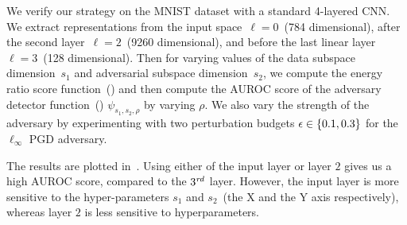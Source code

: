 
We verify our strategy on the MNIST dataset with a standard 4-layered CNN. We
extract representations from the input space~\(\ell=0\)~(784 dimensional), after
the second layer~\(\ell=2\)~(9260 dimensional), and before the last linear
layer~\(\ell=3\)~(128 dimensional). Then for varying values of the data subspace
dimension~\(s_1\) and adversarial subspace dimension~\(s_2\), we compute the energy ratio score function~() and then compute the AUROC score of the adversary detector function~() \(\psi_{s_1, s_2, \rho} \)  by varying \(\rho\). We also vary the strength of the adversary by experimenting with two perturbation budgets \(\epsilon\in\left\{{0.1, 0.3}\right\}\) for the \(\ell_\infty\) PGD adversary.

The results are plotted in~. Using either of the
input layer or layer \(2\) gives us a high AUROC score, compared to the \(3^{\it rd}\) layer. However, the input layer is more sensitive to the hyper-parameters \(s_1\) and \(s_2\)~(the X and the Y axis respectively), whereas layer \(2\) is less sensitive to hyperparameters.

